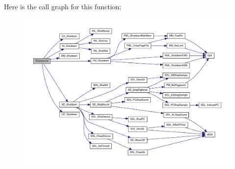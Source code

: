 Here is the call graph for this function:
\nopagebreak
\begin{figure}[H]
\begin{center}
\leavevmode
\includegraphics[width=400pt]{WL__MAIN_8C_a715f77542ce1f3db369235ae2d841d2e_cgraph}
\end{center}
\end{figure}




